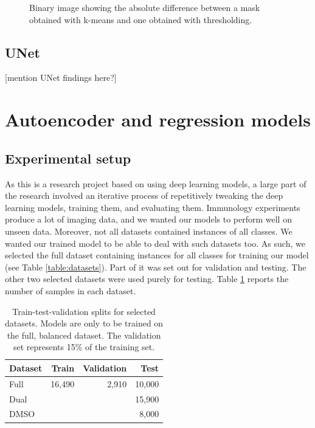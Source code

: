 \begin{figure}[h]
    \centering
    \caption{Binary image showing the absolute difference between a mask obtained with k-means and one obtained with thresholding.}
    \label{fig:maskdiff}
\end{figure}

\subsection{UNet}

[mention UNet findings here?]

\section{Autoencoder and regression models}

\subsection{Experimental setup}

As this is a research project based on using deep learning models, a large part of the research involved an iterative process of repetitively tweaking the deep learning models, training them, and evaluating them. Immunology experiments produce a lot of imaging data, and we wanted our models to perform well on unseen data. Moreover, not all datasets contained instances of all classes. We wanted our trained model to be able to deal with such datasets too. As such, we selected the full dataset containing instances for all classes for training our model (see Table \ref{table:datasets}). Part of it was set out for validation and testing. The other two selected datasets were used purely for testing. Table \ref{table:splits} reports the number of samples in each dataset.

\begin{table}[h]
\centering
\begin{tabular}{l|r|r|r}
\hline
\rowcolor[HTML]{EFEFEF}
Dataset       & Train  & Validation & Test   \\ \hline
Full & 16,490 & 2,910      & 10,000 \\
Dual   &        &            & 15,900 \\
DMSO          &        &            & 8,000  \\ \hline
\end{tabular}
\caption{Train-test-validation splits for selected datasets. Models are only to be trained on the full, balanced dataset. The validation set represents 15\% of the training set.}
\label{table:splits}
\end{table}

